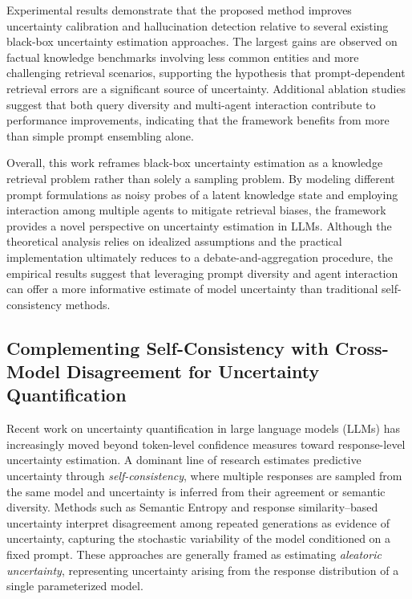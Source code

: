 Experimental results demonstrate that the proposed method improves uncertainty calibration and hallucination detection relative to several existing black-box uncertainty estimation approaches. The largest gains are observed on factual knowledge benchmarks involving less common entities and more challenging retrieval scenarios, supporting the hypothesis that prompt-dependent retrieval errors are a significant source of uncertainty. Additional ablation studies suggest that both query diversity and multi-agent interaction contribute to performance improvements, indicating that the framework benefits from more than simple prompt ensembling alone.

Overall, this work reframes black-box uncertainty estimation as a knowledge retrieval problem rather than solely a sampling problem. By modeling different prompt formulations as noisy probes of a latent knowledge state and employing interaction among multiple agents to mitigate retrieval biases, the framework provides a novel perspective on uncertainty estimation in LLMs. Although the theoretical analysis relies on idealized assumptions and the practical implementation ultimately reduces to a debate-and-aggregation procedure, the empirical results suggest that leveraging prompt diversity and agent interaction can offer a more informative estimate of model uncertainty than traditional self-consistency methods.



\subsection{Complementing Self-Consistency with Cross-Model Disagreement for Uncertainty Quantification}

Recent work on uncertainty quantification in large language models (LLMs) has increasingly moved beyond token-level confidence measures toward response-level uncertainty estimation. A dominant line of research estimates predictive uncertainty through \emph{self-consistency}, where multiple responses are sampled from the same model and uncertainty is inferred from their agreement or semantic diversity. Methods such as Semantic Entropy and response similarity–based uncertainty interpret disagreement among repeated generations as evidence of uncertainty, capturing the stochastic variability of the model conditioned on a fixed prompt. These approaches are generally framed as estimating \emph{aleatoric uncertainty}, representing uncertainty arising from the response distribution of a single parameterized model.

